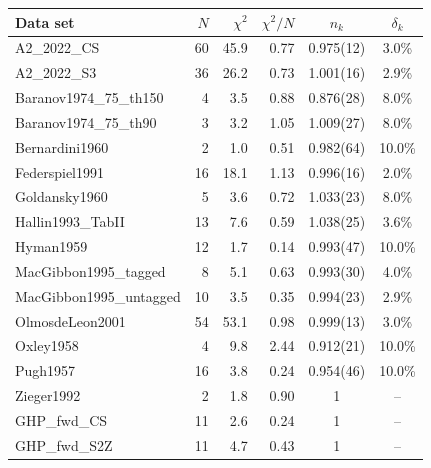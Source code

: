 \begin{tabular}{lrrrcc}
\hline
Data set & $N$ & $\chi^2$ & $\chi^2/N$ & $n_k$ & $\delta_k$ \\
\hline
A2\_2022\_CS & 60 & 45.9 & 0.77 & 0.975(12) & 3.0\% \\
A2\_2022\_S3 & 36 & 26.2 & 0.73 & 1.001(16) & 2.9\% \\
Baranov1974\_75\_th150 & 4 & 3.5 & 0.88 & 0.876(28) & 8.0\% \\
Baranov1974\_75\_th90 & 3 & 3.2 & 1.05 & 1.009(27) & 8.0\% \\
Bernardini1960 & 2 & 1.0 & 0.51 & 0.982(64) & 10.0\% \\
Federspiel1991 & 16 & 18.1 & 1.13 & 0.996(16) & 2.0\% \\
Goldansky1960 & 5 & 3.6 & 0.72 & 1.033(23) & 8.0\% \\
Hallin1993\_TabII & 13 & 7.6 & 0.59 & 1.038(25) & 3.6\% \\
Hyman1959 & 12 & 1.7 & 0.14 & 0.993(47) & 10.0\% \\
MacGibbon1995\_tagged & 8 & 5.1 & 0.63 & 0.993(30) & 4.0\% \\
MacGibbon1995\_untagged & 10 & 3.5 & 0.35 & 0.994(23) & 2.9\% \\
OlmosdeLeon2001 & 54 & 53.1 & 0.98 & 0.999(13) & 3.0\% \\
Oxley1958 & 4 & 9.8 & 2.44 & 0.912(21) & 10.0\% \\
Pugh1957 & 16 & 3.8 & 0.24 & 0.954(46) & 10.0\% \\
Zieger1992 & 2 & 1.8 & 0.90 & 1 & -- \\
GHP\_fwd\_CS & 11 & 2.6 & 0.24 & 1 & -- \\
GHP\_fwd\_S2Z & 11 & 4.7 & 0.43 & 1 & -- \\
\hline
\end{tabular}

